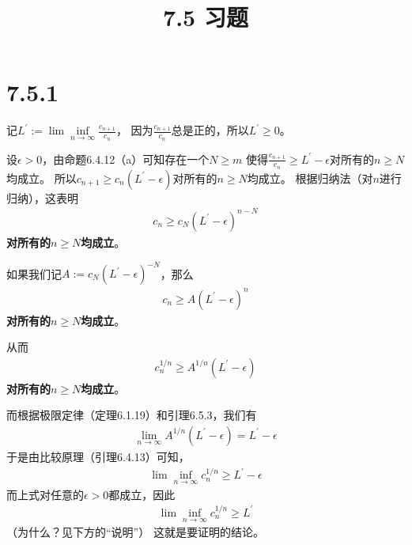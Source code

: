 \documentclass{article}
\theoremstyle{mystyle}
\begin{document}
\title{7.5 习题}
\maketitle

\section*{7.5.1}
记$L^\prime := \lim \inf\limits_{n \rightarrow \infty} \frac{c_{n+1}}{c_n}$，
因为$\frac{c_{n+1}}{c_n}$总是正的，所以$L^\prime \geq 0$。

设$\epsilon > 0$，由命题6.4.12（a）可知存在一个$N \geq m$
使得$\frac{c_{n+1}}{c_n} \geq L^\prime - \epsilon$对所有的$n \geq N$均成立。
所以$c_{n+1} \geq c_n(L^\prime - \epsilon)$对所有的$n \geq N$均成立。
根据归纳法（对$n$进行归纳），这表明
\begin{align*}
  c_n \geq c_N(L^\prime - \epsilon)^{n-N}
\end{align*}
\textbf{对所有的$n \geq N$均成立}。

如果我们记$A := c_N(L^\prime - \epsilon)^{-N}$，那么
\begin{align*}
  c_n \geq A(L^\prime - \epsilon)^n
\end{align*}
\textbf{对所有的$n \geq N$均成立}。

从而
\begin{align*}
  c_n^{1/n} \geq A^{1/n}(L^\prime - \epsilon)
\end{align*}
\textbf{对所有的$n \geq N$均成立}。

而根据极限定律（定理6.1.19）和引理6.5.3，我们有
\begin{align*}
  \lim \limits_{n \rightarrow \infty} A^{1/n}(L^\prime - \epsilon) = L^\prime - \epsilon
\end{align*}
于是由比较原理（引理6.4.13）可知，
\begin{align*}
  \lim \inf\limits_{n \rightarrow \infty} c_n^{1/n} \geq L^\prime - \epsilon
\end{align*}
而上式对任意的$\epsilon > 0$都成立，因此
\begin{align*}
  \lim \inf\limits_{n \rightarrow \infty} c_n^{1/n} \geq L^\prime
\end{align*}
（为什么？见下方的“说明”）
这就是要证明的结论。
\end{document}
